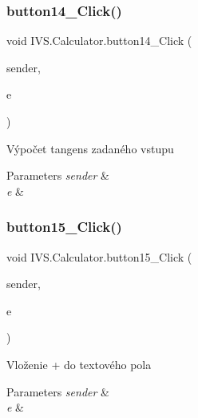 \subsubsection{\texorpdfstring{button14\+\_\+\+Click()}{button14\_Click()}}
{\footnotesize\ttfamily void I\+V\+S.\+Calculator.\+button14\+\_\+\+Click (\begin{DoxyParamCaption}\item[{object}]{sender,  }\item[{Event\+Args}]{e }\end{DoxyParamCaption})\hspace{0.3cm}{\ttfamily [protected]}}



Výpočet tangens zadaného vstupu 


\begin{DoxyParams}{Parameters}
{\em sender} & \\
\hline
{\em e} & \\
\hline
\end{DoxyParams}
\mbox{\label{class_i_v_s_1_1_calculator_a4aab8fcd134875c22735f5c69709f3a9}} 
\subsubsection{\texorpdfstring{button15\+\_\+\+Click()}{button15\_Click()}}
{\footnotesize\ttfamily void I\+V\+S.\+Calculator.\+button15\+\_\+\+Click (\begin{DoxyParamCaption}\item[{object}]{sender,  }\item[{Event\+Args}]{e }\end{DoxyParamCaption})\hspace{0.3cm}{\ttfamily [protected]}}



Vloženie \textquotesingle{}+\textquotesingle{} do textového pola 


\begin{DoxyParams}{Parameters}
{\em sender} & \\
\hline
{\em e} & \\
\hline
\end{DoxyParams}
\mbox{\label{class_i_v_s_1_1_calculator_a8e6a0c70145a0d3bfe53de19b9e980ea}} 
